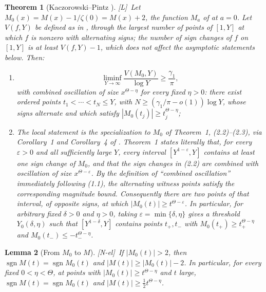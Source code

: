\documentclass[11pt,reqno]{amsart}
\numberwithin{equation}{section}
\theoremstyle{plain}
\newtheorem{theorem}{Theorem}[section]
\newtheorem{lemma}[theorem]{Lemma}
\theoremstyle{definition}
\theoremstyle{remark}
\DeclareMathOperator{\sgn}{sgn}
\newcommand{\tagNE}{\textup{[N-el]}}
\newcommand{\tagL}{\textup{[L]}}
\begin{document}
\begin{theorem}[Kaczorowski--Pintz {\cite{KP86}}]
\label{thm:KP-quoted}
\tagL\ Let $M_0(x)=M(x)-1/\zeta(0)=M(x)+2$, the function $M_a$ of \cite{KP86} at
$a=0$. Let $V(f,Y)$ be defined as in \cite{KP86}, through the largest number of
points of $[1,Y]$ at which $f$ is nonzero with alternating signs; the number
of sign changes of $f$ on $[1,Y]$ is at least $V(f,Y)-1$, which does not
affect the asymptotic statements below. Then:
\begin{enumerate}[label=\textup{(\roman*)}]
\item \cite[Corollary~4, p.~178, (2.13)--(2.15)]{KP86}
\begin{equation}
\label{eq:KP-signchanges}
\liminf_{Y\to\infty}\frac{V(M_0,Y)}{\log Y}\ge\frac{\gamma_1}{\pi},
\end{equation}
with combined oscillation of size $x^{\Theta-\eta}$ for every fixed
$\eta>0$: there exist ordered points $t_1<\cdots<t_N\le Y$, with
$N\ge(\gamma_1/\pi-o(1))\log Y$, whose signs alternate and which satisfy
$|M_0(t_j)|\ge t_j^{\Theta-\eta}$;
\item The local statement is the specialization to $M_0$ of
Theorem~1, (2.2)--(2.3), via Corollary~1 and Corollary~4 of \cite{KP86}.
Theorem~1 states literally that, for every $\varepsilon>0$ and all
sufficiently large $Y$, every interval $[Y^{1-\varepsilon},Y]$ contains at
least one sign change of $M_0$, and that the sign changes in (2.2) are
combined with oscillation of size $x^{\Theta-\varepsilon}$.  By the
definition of ``combined oscillation'' immediately following (1.1), the
alternating witness points satisfy the corresponding magnitude bound.
Consequently there are two points of that interval, of opposite signs, at
which $|M_0(t)|\ge t^{\Theta-\varepsilon}$.  In particular, for arbitrary fixed
$\delta>0$ and $\eta>0$, taking
$\varepsilon=\min\{\delta,\eta\}$ gives a threshold
$Y_0(\delta,\eta)$ such that $[Y^{1-\delta},Y]$ contains points $t_+,t_-$
with
$M_0(t_+)\ge t_+^{\Theta-\eta}$ and
$M_0(t_-)\le-t_-^{\Theta-\eta}$.
\end{enumerate}
\end{theorem}

\begin{lemma}[From $M_0$ to $M$]
\label{lem:KP-translation}
\tagNE\ If $|M_0(t)|>2$, then $\sgn M(t)=\sgn M_0(t)$ and
$|M(t)|\ge|M_0(t)|-2$. In particular, for every fixed $0<\eta<\Theta$, at points with
$|M_0(t)|\ge t^{\Theta-\eta}$ and $t$ large,
$\sgn M(t)=\sgn M_0(t)$ and $|M(t)|\ge\frac12t^{\Theta-\eta}$.
\end{lemma}
\end{document}
